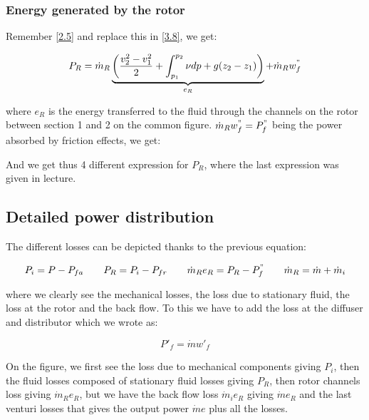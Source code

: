 \subsubsection{Energy generated by the rotor}
Remember \eqref{2.5} and replace this in \eqref{3.8}, we get: 

\begin{equation}
P_R = \dot{m}_R \underbrace{\left( \frac{v_2 ^2 - v_1^2}{2}  + \int _{p_1}^{p_2} \nu dp + g(z_2 - z_1) \right)}_{e_R} + \dot{m} _R w^"_f
\end{equation}

where $e_R$ is the energy transferred to the fluid through the channels on the rotor between section 1 and 2 on the common figure. $\dot{m}_R w^"_f = P^"_f$ being the power absorbed by friction effects, we get: 

\begin{center}
\end{center}

And we get thus 4 different expression for $P_R$, where the last expression was given in lecture. 

\subsection{Detailed power distribution}
The different losses can be depicted thanks to the previous equation:

\begin{equation}
P_i = P-P_{fa} \qquad P_R = P_i - P_{fr} \qquad \dot{m}_Re_R = P_R - P^"_{f} \qquad \dot{m}_R = \dot{m} + \dot{m}_i
\end{equation}

where we clearly see the mechanical losses, the loss due to stationary fluid, the loss at the rotor and the back flow. To this we have to add the loss at the diffuser and distributor which we wrote as:

\begin{equation}
P'_f = \dot{m}w'_f
\end{equation}

On the figure, we first see the loss due to mechanical components giving $P_i$, then the fluid losses composed of stationary fluid losses giving $P_R$, then rotor channels loss giving $\dot{m}_Re_R$, but we have the back flow loss $\dot{m}_i e_R$ giving $\dot{m}e_R$ and the last venturi losses that gives the output power $\dot{m}e$ plus all the losses. 

